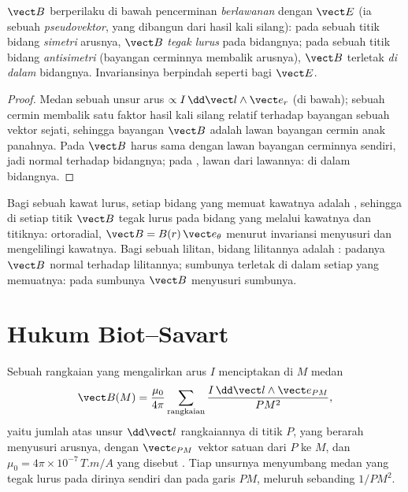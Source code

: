 \begin{proposition}\label{prop:b1:magnetostatics:symmetry}
$\vect B$ berperilaku di bawah pencerminan \emph{berlawanan} dengan $\vect E$
(ia sebuah \emph{pseudovektor}, yang dibangun dari hasil kali silang): pada sebuah
titik bidang \emph{simetri} arusnya, $\vect B$ \emph{tegak lurus} pada
bidangnya; pada sebuah titik bidang \emph{antisimetri} (bayangan cerminnya
membalik arusnya), $\vect B$ terletak \emph{di dalam} bidangnya. Invariansinya
berpindah seperti bagi $\vect E$.
\end{proposition}

\begin{proof}
Medan sebuah unsur arus $\propto I\,\dd\vect l\wedge\vect e_r$
(di bawah); sebuah cermin membalik satu faktor hasil kali silang relatif
terhadap bayangan sebuah vektor sejati, sehingga bayangan $\vect B$ adalah
lawan bayangan cermin anak panahnya. Pada  $\vect B$ harus sama
dengan lawan bayangan cerminnya sendiri, jadi normal terhadap bidangnya; pada
, lawan dari lawannya: di dalam bidangnya.
\end{proof}

\begin{example}\label{ex:b1:magnetostatics:symmetryuse}
Bagi sebuah kawat lurus, setiap bidang yang memuat kawatnya adalah ,
sehingga di setiap titik $\vect B$ tegak lurus pada bidang yang melalui
kawatnya dan titiknya: ortoradial, $\vect B = B(r)\,\vect e_\theta$ menurut
invariansi menyusuri dan mengelilingi kawatnya. Bagi sebuah lilitan, bidang lilitannya
adalah : padanya $\vect B$ normal terhadap lilitannya; sumbunya
terletak di dalam setiap  yang memuatnya: pada sumbunya $\vect B$
menyusuri sumbunya.
\end{example}

\section{Hukum Biot--Savart}

\begin{theorem}\label{thm:b1:magnetostatics:biotsavart}
Sebuah rangkaian yang mengalirkan arus $I$ menciptakan di $M$ medan
\[
\vect B(M) = \frac{\mu_0}{4\pi}\sum_{\text{rangkaian}} \frac{I\,\dd\vect l\wedge\vect e_{PM}}{PM^2} ,
\]
yaitu jumlah atas unsur $\dd\vect l$ rangkaiannya di titik $P$,
yang berarah menyusuri arusnya, dengan $\vect e_{PM}$ vektor satuan dari
$P$ ke $M$, dan $\mu_0 = 4\pi \times 10^{-7}\,\unit{T.m/A}$ yang disebut
\emph{}. Tiap unsurnya menyumbang medan yang
tegak lurus pada dirinya sendiri dan pada garis $PM$, meluruh sebanding $1/PM^2$.
\end{theorem}
\admitted


